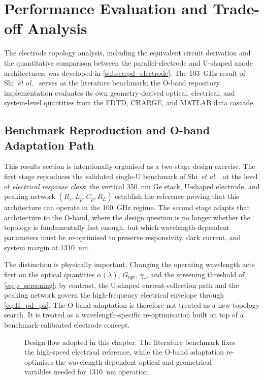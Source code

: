 \section[Results and Discussion]{Performance Evaluation and Trade-off Analysis}
\label{sec:pd_results}

The electrode topology analysis, including the equivalent circuit derivation
and the quantitative comparison between the parallel-electrode and U-shaped
anode architectures, was developed in \cref{subsec:pd_electrode}. The
\SI{103}{\giga\hertz} result of Shi~\textit{et al.}~\cite{Shi2024} serves as
the literature benchmark; the O-band repository implementation evaluates its
own geometry-derived optical, electrical, and system-level quantities from the
FDTD, CHARGE, and MATLAB data cascade.

\subsection[Benchmark Reproduction]{Benchmark Reproduction and O-band Adaptation Path}
\label{subsec:pd_benchmark_oband}

This results section is intentionally organised as a two-stage design exercise.
The first stage reproduces the validated single-U benchmark of
Shi~\textit{et al.}~\cite{Shi2024} at the level of \emph{electrical response
class}: the vertical \SI{350}{\nano\metre} Ge stack, U-shaped electrode, and
peaking network $(R_s,L_p,C_p,R_L)$ establish the reference proving that this
architecture can operate in the \SI{100}{\giga\hertz} regime. The second stage
adapts that architecture to the O-band, where the design question is no longer
whether the topology is fundamentally fast enough, but which
wavelength-dependent parameters must be re-optimised to preserve responsivity,
dark current, and system margin at \SI{1310}{\nano\metre}.

The distinction is physically important. Changing the operating wavelength acts
first on the optical quantities $\alpha(\lambda)$, $G_{\mathrm{opt}}$,
$\eta_c$, and the screening threshold of \cref{eq:p_screening}; by contrast,
the U-shaped current-collection path and the peaking network govern the
high-frequency electrical envelope through \cref{eq:H_pd_pk}. The O-band
adaptation is therefore not treated as a new topology search. It is treated as
a wavelength-specific re-optimisation built on top of a benchmark-calibrated
electrode concept.

\begin{figure}[H]
    \centering
    \caption{Design flow adopted in this chapter. The literature benchmark fixes
    the high-speed electrical reference, while the O-band adaptation re-optimises
    the wavelength-dependent optical and geometrical variables needed for
    \SI{1310}{\nano\metre} operation.}
    \label{fig:benchmark_oband_flow}
\end{figure}

